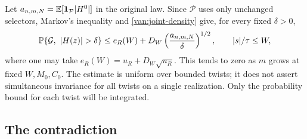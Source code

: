 Let $a_{n,m,N}=\mathbb E[\mathbf 1_{\mathcal P}|H^0|]$ in the original law.
Since $\mathcal P$ uses only unchanged selectors, Markov's inequality
and \cref{van:joint-density} give, for every fixed $\delta>0$,
\begin{equation}\label{van:twist-probability}
 \PP\{\mathcal G,\ |H(z)|>\delta\}
 \leq e_R(W)+D_W\left(\frac{a_{n,m,N}}{\delta}\right)^{1/2},
 \qquad |s|/\tau\leq W,
\end{equation}
where one may take $e_R(W)=u_R+D_W\sqrt{u_R}$. This tends to zero
as $m$ grows at fixed $W,M_0,C_0$. The estimate is uniform over
bounded twists; it does not assert simultaneous invariance for all
twists on a single realization. Only the probability bound for each
twist will be integrated.

\subsection{The contradiction}

